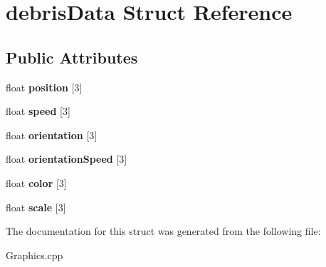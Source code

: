 \hypertarget{structdebris_data}{\section{debris\-Data Struct Reference}
\label{structdebris_data}
}
\subsection*{Public Attributes}
\begin{DoxyCompactItemize}
\item 
\hypertarget{structdebris_data_ae4f0c984ae39ce6b8d13ff0c990c1bfd}{float {\bfseries position} \mbox{[}3\mbox{]}}\label{structdebris_data_ae4f0c984ae39ce6b8d13ff0c990c1bfd}

\item 
\hypertarget{structdebris_data_ad01d6ba3bfef2f236d86dc4f599a7b1b}{float {\bfseries speed} \mbox{[}3\mbox{]}}\label{structdebris_data_ad01d6ba3bfef2f236d86dc4f599a7b1b}

\item 
\hypertarget{structdebris_data_ace35386c9b6e1b7213cbb747b74bb971}{float {\bfseries orientation} \mbox{[}3\mbox{]}}\label{structdebris_data_ace35386c9b6e1b7213cbb747b74bb971}

\item 
\hypertarget{structdebris_data_a103c4902130310ec4d125adb1e79b147}{float {\bfseries orientation\-Speed} \mbox{[}3\mbox{]}}\label{structdebris_data_a103c4902130310ec4d125adb1e79b147}

\item 
\hypertarget{structdebris_data_a4b9141e8804d9d4182bb7aad8fa389d4}{float {\bfseries color} \mbox{[}3\mbox{]}}\label{structdebris_data_a4b9141e8804d9d4182bb7aad8fa389d4}

\item 
\hypertarget{structdebris_data_ab65454433065b2ead87fbfe7852a4626}{float {\bfseries scale} \mbox{[}3\mbox{]}}\label{structdebris_data_ab65454433065b2ead87fbfe7852a4626}

\end{DoxyCompactItemize}


The documentation for this struct was generated from the following file\-:\begin{DoxyCompactItemize}
\item 
Graphics.\-cpp\end{DoxyCompactItemize}
